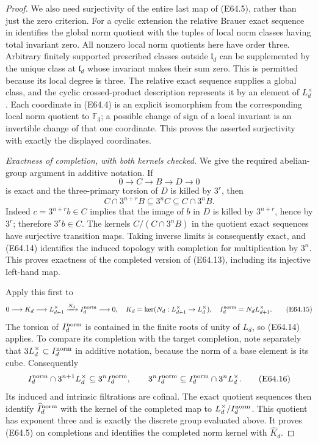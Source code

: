 \begin{proof}
We also need surjectivity of the entire last map of (E64.5),
rather than just the zero criterion.
For a cyclic extension the relative Brauer exact sequence in
\cite[VIII, \S4, the exact sequence preceding Lemma4.1 and its proof;
IV, Theorem3.14]{E_MilneCFT} identifies the global norm quotient
with the tuples of local norm classes having total invariant zero.
All nonzero local norm quotients here have order three.
Arbitrary finitely supported prescribed classes outside $\mathfrak l_d$
can be supplemented by the unique class at $\mathfrak l_d$ whose
invariant makes their sum zero. This is permitted because its local
degree is three. The relative exact sequence supplies a global class,
and the cyclic crossed-product description represents it by an
element of $L_d^\times$. Each coordinate in (E64.4) is an explicit
isomorphism from the corresponding local norm quotient to
$\mathbb F_3$; a possible change of sign of a local invariant is
an invertible change of that one coordinate.
This proves the asserted surjectivity with exactly the displayed
coordinates.

\emph{Exactness of completion, with both kernels checked.}
We give the required abelian-group argument in additive notation.
If
\[
                 0\longrightarrow C\longrightarrow B
                      \longrightarrow D\longrightarrow0
 \tag{E64.13}
\]
is exact and the three-primary torsion of $D$ is killed by $3^r$,
then
\[
 C\cap3^{n+r}B\subseteq3^nC\subseteq C\cap3^nB .
 \tag{E64.14}
\]
Indeed $c=3^{n+r}b\in C$ implies that the image of $b$ in $D$
is killed by $3^{n+r}$, hence by $3^r$; therefore $3^rb\in C$.
The kernels $C/(C\cap3^nB)$ in the quotient exact sequences have
surjective transition maps. Taking inverse limits is consequently
exact, and (E64.14) identifies the induced topology with completion
for multiplication by $3^n$. This proves exactness of the completed
version of (E64.13), including its injective left-hand map.

Apply this first to
\[
 0\longrightarrow K_d\longrightarrow L_{d+1}^\times
                  \xrightarrow{N_d} I_d^{\rm norm}\longrightarrow0,
 \quad
 K_d=\ker(N_d:L_{d+1}^\times\to L_d^\times),\quad
 I_d^{\rm norm}=N_dL_{d+1}^\times.
 \tag{E64.15}
\]
The torsion of $I_d^{\rm norm}$ is contained in the finite roots of
unity of $L_d$, so (E64.14) applies.
To compare its completion with the target completion, note separately
that $3L_d^\times\subset I_d^{\rm norm}$ in additive notation,
because the norm of a base element is its cube. Consequently
\[
 I_d^{\rm norm}\cap3^{n+1}L_d^\times
             \subseteq3^nI_d^{\rm norm},\qquad
 3^nI_d^{\rm norm}\subseteq
             I_d^{\rm norm}\cap3^nL_d^\times .
 \tag{E64.16}
\]
Its induced and intrinsic filtrations are cofinal.
The exact quotient sequences then identify
$\widehat I_d^{\rm norm}$ with the kernel of the completed
map to $L_d^\times/I_d^{\rm norm}$.
This quotient has exponent three and is exactly the discrete group
evaluated above. It proves (E64.5) on completions and identifies
the completed norm kernel with $\widehat K_d$.


\end{proof}
